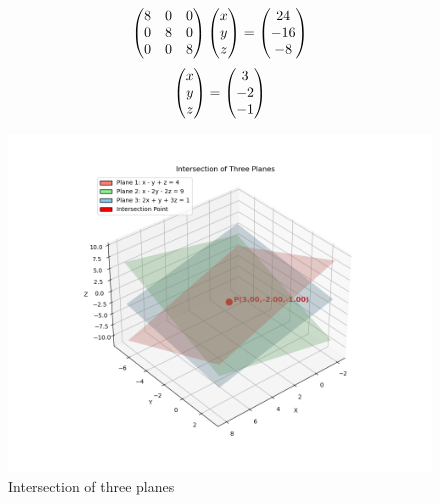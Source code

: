 \documentclass[12pt]{article}
\begin{document}
\begin{align}
    \begin{pmatrix}8 & 0 & 0 \\
      0 & 8 & 0 \\
      0 & 0 & 8\end{pmatrix}
\begin{pmatrix}x \\ y \\ z\end{pmatrix}
= 
\begin{pmatrix}24 \\ -16 \\ -8\end{pmatrix}
\end{align}
\begin{align}
    \begin{pmatrix}x \\ y \\ z\end{pmatrix}
= 
\begin{pmatrix}3 \\ -2 \\ -1\end{pmatrix}
\end{align}
\begin{figure}[H]
    \centering
    \includegraphics[width=0.5\linewidth]{figures/planes_intersection_c.png}
    \caption{Intersection of three planes}
    \label{fig:placeholder}
\end{figure}
\end{document}
